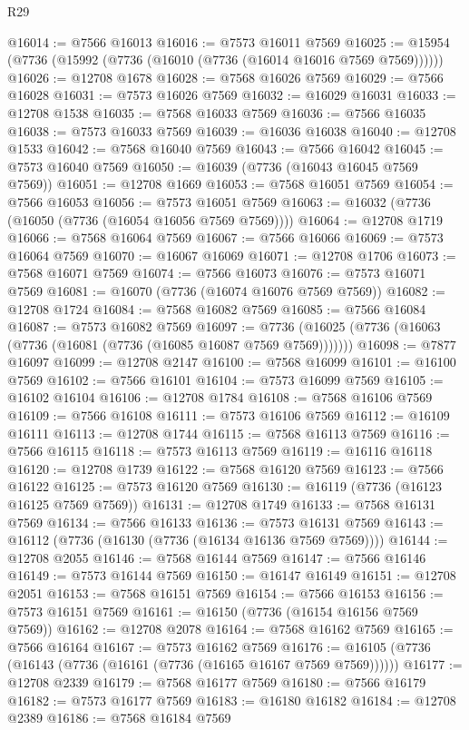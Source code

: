 \begin{lexlean}{R29}
\begin{coremodule}
@16014 := @7566 @16013
@16016 := @7573 @16011 @7569
@16025 := @15954 (@7736 (@15992 (@7736 (@16010 (@7736 (@16014 @16016 @7569 @7569))))))
@16026 := @12708 @1678
@16028 := @7568 @16026 @7569
@16029 := @7566 @16028
@16031 := @7573 @16026 @7569
@16032 := @16029 @16031
@16033 := @12708 @1538
@16035 := @7568 @16033 @7569
@16036 := @7566 @16035
@16038 := @7573 @16033 @7569
@16039 := @16036 @16038
@16040 := @12708 @1533
@16042 := @7568 @16040 @7569
@16043 := @7566 @16042
@16045 := @7573 @16040 @7569
@16050 := @16039 (@7736 (@16043 @16045 @7569 @7569))
@16051 := @12708 @1669
@16053 := @7568 @16051 @7569
@16054 := @7566 @16053
@16056 := @7573 @16051 @7569
@16063 := @16032 (@7736 (@16050 (@7736 (@16054 @16056 @7569 @7569))))
@16064 := @12708 @1719
@16066 := @7568 @16064 @7569
@16067 := @7566 @16066
@16069 := @7573 @16064 @7569
@16070 := @16067 @16069
@16071 := @12708 @1706
@16073 := @7568 @16071 @7569
@16074 := @7566 @16073
@16076 := @7573 @16071 @7569
@16081 := @16070 (@7736 (@16074 @16076 @7569 @7569))
@16082 := @12708 @1724
@16084 := @7568 @16082 @7569
@16085 := @7566 @16084
@16087 := @7573 @16082 @7569
@16097 := @7736 (@16025 (@7736 (@16063 (@7736 (@16081 (@7736 (@16085 @16087 @7569 @7569)))))))
@16098 := @7877 @16097
@16099 := @12708 @2147
@16100 := @7568 @16099
@16101 := @16100 @7569
@16102 := @7566 @16101
@16104 := @7573 @16099 @7569
@16105 := @16102 @16104
@16106 := @12708 @1784
@16108 := @7568 @16106 @7569
@16109 := @7566 @16108
@16111 := @7573 @16106 @7569
@16112 := @16109 @16111
@16113 := @12708 @1744
@16115 := @7568 @16113 @7569
@16116 := @7566 @16115
@16118 := @7573 @16113 @7569
@16119 := @16116 @16118
@16120 := @12708 @1739
@16122 := @7568 @16120 @7569
@16123 := @7566 @16122
@16125 := @7573 @16120 @7569
@16130 := @16119 (@7736 (@16123 @16125 @7569 @7569))
@16131 := @12708 @1749
@16133 := @7568 @16131 @7569
@16134 := @7566 @16133
@16136 := @7573 @16131 @7569
@16143 := @16112 (@7736 (@16130 (@7736 (@16134 @16136 @7569 @7569))))
@16144 := @12708 @2055
@16146 := @7568 @16144 @7569
@16147 := @7566 @16146
@16149 := @7573 @16144 @7569
@16150 := @16147 @16149
@16151 := @12708 @2051
@16153 := @7568 @16151 @7569
@16154 := @7566 @16153
@16156 := @7573 @16151 @7569
@16161 := @16150 (@7736 (@16154 @16156 @7569 @7569))
@16162 := @12708 @2078
@16164 := @7568 @16162 @7569
@16165 := @7566 @16164
@16167 := @7573 @16162 @7569
@16176 := @16105 (@7736 (@16143 (@7736 (@16161 (@7736 (@16165 @16167 @7569 @7569))))))
@16177 := @12708 @2339
@16179 := @7568 @16177 @7569
@16180 := @7566 @16179
@16182 := @7573 @16177 @7569
@16183 := @16180 @16182
@16184 := @12708 @2389
@16186 := @7568 @16184 @7569

\end{coremodule}
\end{lexlean}
